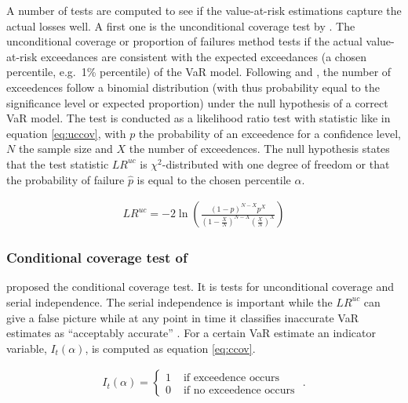 \documentclass[a4paper, nobind]{templates/ociamthesis}
\begin{document}
\noindent A number of tests are computed to see if the value-at-risk estimations capture the actual losses well. A first one is the unconditional coverage test by \textcite{kupiec1995}. The unconditional coverage or proportion of failures method tests if the actual value-at-risk exceedances are consistent with the expected exceedances (a chosen percentile, e.g.~1\% percentile) of the VaR model. Following \textcite{kupiec1995} and \textcite{ghalanos2020}, the number of exceedences follow a binomial distribution (with thus probability equal to the significance level or expected proportion) under the null hypothesis of a correct VaR model. The test is conducted as a likelihood ratio test with statistic like in equation \eqref{eq:uccov}, with \(p\) the probability of an exceedence for a confidence level, \(N\) the sample size and \(X\) the number of exceedences. The null hypothesis states that the test statistic \(L R^{u c}\) is \(\chi^2\)-distributed with one degree of freedom or that the probability of failure \(\hat p\) is equal to the chosen percentile \(\alpha\).

\begin{align}
L R^{u c}=-2 \ln \left(\frac{(1-p)^{N-X} p^{X}}{\left(1-\frac{X}{N}\right)^{N-X}\left(\frac{X}{N}\right)^{X}}\right)
\label{eq:uccov}
\end{align}

\hypertarget{conditional-coverage-test-of-christoffersen2001}{%
\subsubsection{\texorpdfstring{Conditional coverage test of \textcite{christoffersen2001}}{Conditional coverage test of @christoffersen2001}}\label{conditional-coverage-test-of-christoffersen2001}}

\noindent \textcite{christoffersen2001} proposed the conditional coverage test. It is tests for unconditional coverage and serial independence. The serial independence is important while the \(L R^{u c}\) can give a false picture while at any point in time it classifies inaccurate VaR estimates as ``acceptably accurate'' \autocite{bali2007}. For a certain VaR estimate an indicator variable, \(I_t(\alpha)\), is computed as equation \eqref{eq:ccov}.

\begin{align}
I_{t}(\alpha)=\left\{\begin{array}{ll}
1 & \text { if exceedence occurs } \\
0 & \text { if no exceedence occurs }
\end{array} .\right.
\label{eq:ccov}
\end{align}
\end{document}
